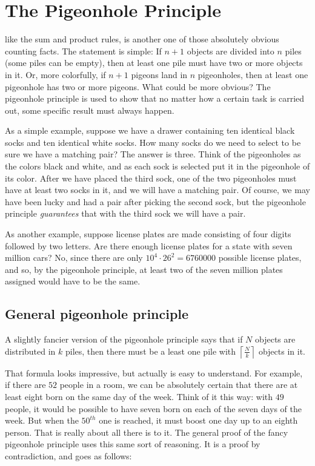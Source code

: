 \chapter{The Pigeonhole Principle}\label{ch:The Pigeonhole Principle}

 like the sum and product rules, is another one of
those absolutely 
obvious counting facts.
 The statement is simple: If $n+1$ objects are divided into
$n$ piles (some piles can be empty), then at least one pile must have two or
more objects in it. Or, more colorfully, if $n+1$ pigeons land in $n$ pigeonholes,
then at least one pigeonhole has two or more pigeons. What could be more obvious?
The pigeonhole 
principle is used to show that no matter how a certain task is carried
out, some specific result must always happen. 

As a simple example, suppose we have a drawer containing ten 
identical black socks and ten identical white socks. 
How many socks do we need to select to be sure we have a matching pair? The
answer is three. Think of the pigeonholes as the colors black and white, and
as each sock is selected put it in the pigeonhole of its color. After we have
placed the third sock, one of the two pigeonholes must have at least two
socks in it, and we will have a matching pair. Of course, we may have been
lucky and had a pair after picking the second sock, but the pigeonhole principle
\emph{guarantees} that with the third sock we will have a pair.


As another example, suppose license plates are made consisting
of four digits followed by two letters. Are there enough license plates for a state
with seven million cars? No, since there are only $10^4\cdot26^2 = 6760000$ 
possible license plates, and so, by the pigeonhole principle, at least two of
the seven million plates assigned would have to be the same.

\section{General pigeonhole principle}
A slightly fancier version of the pigeonhole principle says that if $N$
objects are distributed in $k$ piles, then there must be a least one pile with
$\left\lceil\frac{N}{k}\right\rceil$ objects in it. 

That formula looks impressive,
 but actually is easy to understand. For example, if there are $52$ people
in a room, we can be absolutely certain that there are at least eight born
on the same day of the week. Think of it this way: with $49$ people, it would be
possible to have seven born on each of the seven days of the week. But when the
$50^{th}$ one is reached, it must boost one day up to an eighth person. That is
really about all there is to it. The general proof of the fancy pigeonhole
principle uses this same sort of reasoning. It is a proof by contradiction, 
and goes as follows:

